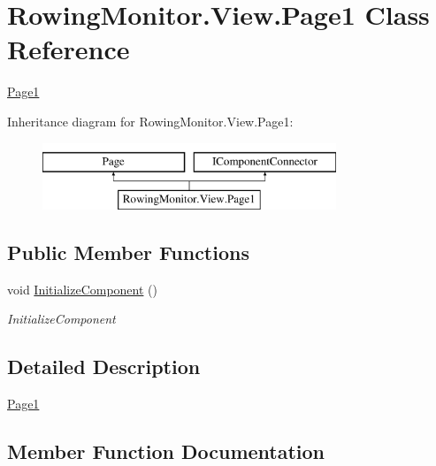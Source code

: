\hypertarget{class_rowing_monitor_1_1_view_1_1_page1}{}\section{Rowing\+Monitor.\+View.\+Page1 Class Reference}
\label{class_rowing_monitor_1_1_view_1_1_page1}


\hyperlink{class_rowing_monitor_1_1_view_1_1_page1}{Page1}  


Inheritance diagram for Rowing\+Monitor.\+View.\+Page1\+:\begin{figure}[H]
\begin{center}
\leavevmode
\includegraphics[height=2.000000cm]{class_rowing_monitor_1_1_view_1_1_page1}
\end{center}
\end{figure}
\subsection*{Public Member Functions}
\begin{DoxyCompactItemize}
\item 
void \hyperlink{class_rowing_monitor_1_1_view_1_1_page1_adf20b2105a2051a245d128555ee9b568}{Initialize\+Component} ()
\begin{DoxyCompactList}\small\item\em Initialize\+Component \end{DoxyCompactList}\end{DoxyCompactItemize}


\subsection{Detailed Description}
\hyperlink{class_rowing_monitor_1_1_view_1_1_page1}{Page1} 



\subsection{Member Function Documentation}
\mbox{\label{class_rowing_monitor_1_1_view_1_1_page1_adf20b2105a2051a245d128555ee9b568}} 
